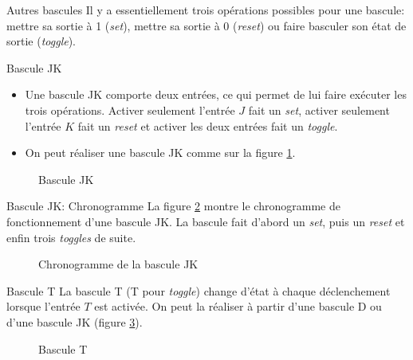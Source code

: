 \documentclass[presentation]{beamer}
\begin{document}
\begin{frame}[label={sec:orge3197f3}]{Autres bascules}
Il y a essentiellement trois opérations possibles pour une bascule:
mettre sa sortie à 1 (\emph{set}), mettre sa sortie à 0 (\emph{reset}) ou faire
basculer son état de sortie (\emph{toggle}).
\end{frame}

\begin{frame}[label={sec:org621c3d4}]{Bascule JK}
\begin{itemize}
\item Une bascule JK comporte deux entrées, ce qui permet de lui faire exécuter les trois opérations. Activer seulement l'entrée \(J\) fait un \emph{set}, activer seulement l'entrée \(K\) fait un \emph{reset} et activer les deux entrées fait un \emph{toggle}.

\item On peut réaliser une bascule JK comme sur la figure \ref{fig:org31941e7}.
\end{itemize}

\begin{figure}[htbp]
\centering

\caption{\label{fig:org31941e7}Bascule JK}
\end{figure}
\end{frame}

\begin{frame}[label={sec:org7af1f40}]{Bascule JK: Chronogramme}
La figure \ref{fig:org8df7eb5} montre le chronogramme de fonctionnement
d'une bascule JK. La bascule fait d'abord un \emph{set}, puis un \emph{reset} et
enfin trois \emph{toggles} de suite.

\begin{figure}[htbp]
\centering

\caption{\label{fig:org8df7eb5}Chronogramme de la bascule JK}
\end{figure}
\end{frame}

\begin{frame}[label={sec:orgf002ceb}]{Bascule T}
La bascule T (T pour \emph{toggle}) change d'état à chaque déclenchement
lorsque l'entrée \(T\) est activée. On peut la réaliser à partir d'une
bascule D ou d'une bascule JK (figure \ref{fig:org369f6ab}).

\begin{figure}[htbp]
\centering

\caption{\label{fig:org369f6ab}Bascule T}
\end{figure}
\end{frame}
\end{document}
